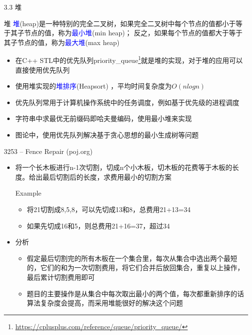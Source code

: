 \begin{frame}{3.3 堆}
    \begin{block}{堆}
        \textcolor{blue}{堆}(heap)是一种特别的完全二叉树，如果完全二叉树中每个节点的值都小于等于其子节点的值，称为\textcolor{blue}{最小堆}(min heap)； 反之，如果每个节点的值都大于等于其子节点的值，称为\textcolor{blue}{最大堆}(max heap)
    \end{block}
    \begin{itemize}
        \item 在C++ STL中的优先队列priority\_queue\footnote{\url{https://cplusplus.com/reference/queue/priority_queue/}}就是堆的实现，对于堆的应用可以直接使用优先队列
        \item 使用堆实现的\textcolor{blue}{堆排序}(Heapsort) ，平均时间复杂度为$O(nlogn)$
        \item 优先队列常用于计算机操作系统中的任务调度，例如基于优先级的进程调度
        \item 字符串中求最优无前缀码即哈夫曼编码，使用最小堆来实现
        \item 图论中，使用优先队列解决基于贪心思想的最小生成树等问题
    \end{itemize}
\end{frame} 
\begin{frame}{3253 -- Fence Repair (poj.org)}
    \begin{itemize}
        \item 将一个长木板进行n-1次切割，切成n个小木板，切木板的花费等于木板的长度。给出最后切割后的长度，求费用最小的切割方案
        \begin{exampleblock}{Example}
            \begin{itemize}
                \item 将21切割成8,5,8，可以先切成13和8，总费用21+13=34
                \item 如果先切成16和5，则总费用21+16=37，超过34
            \end{itemize}
        \end{exampleblock}
        \item 分析
        \begin{itemize}
            \item 假定最后切割完的所有木板在一个集合里，每次从集合中选出两个最短的，它们的和为一次切割费用，将它们合并后放回集合，重复以上操作，最后累计切割费用即可
            \item 题目的主要操作是从集合中每次取出最小的两个值，每次都重新排序的话算法复杂度会提高，而采用堆能很好的解决这个问题
        \end{itemize}
    \end{itemize}
\end{frame}
